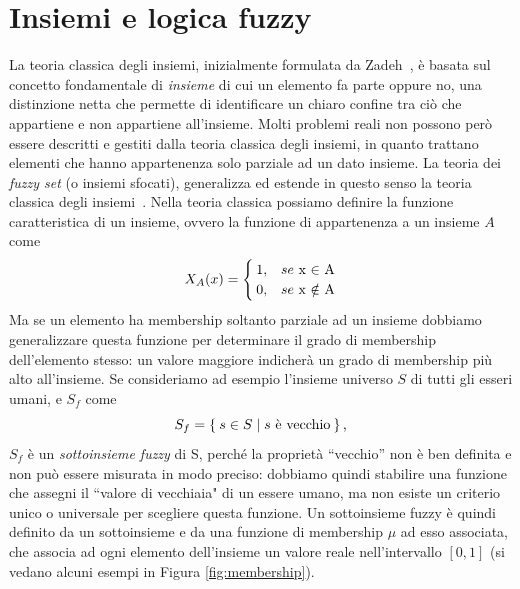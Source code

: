 \documentclass[oneside, openany]{book}
\begin{document}
		\section{Insiemi e logica fuzzy}
		La teoria classica degli insiemi, inizialmente formulata da Zadeh~\cite{bib:zadeh}, è basata sul concetto fondamentale di \textit{insieme} di cui un elemento fa parte oppure no, una distinzione netta che permette di identificare un chiaro confine tra ciò che appartiene e non appartiene all'insieme. Molti problemi reali non possono però essere descritti e gestiti dalla teoria classica degli insiemi, in quanto trattano elementi che hanno appartenenza solo parziale ad un dato insieme. La teoria dei \textit{fuzzy set} (o insiemi sfocati), generalizza ed estende in questo senso la teoria classica degli insiemi~\cite{bib:fuzzy, bib:fuzzy2}.\newline
		Nella teoria classica possiamo definire la funzione caratteristica di un insieme, ovvero la funzione di appartenenza a un insieme $A$ come
		\[
		X_A(x)=
		\begin{cases}
		1, & se $ x $ \in $ A$\\
		0, & se $ x $ \notin $ A$
		\end{cases}
		\]
		Ma se un elemento ha membership soltanto parziale ad un insieme dobbiamo generalizzare questa funzione per determinare il grado di membership dell'elemento stesso: un valore maggiore indicherà un grado di membership più alto all'insieme. Se consideriamo ad esempio l'insieme universo $S$ di tutti gli esseri umani, e $S_f$ come
		\[
		S_f=\Set{s \in S | s \text{ è vecchio}}\text{,}
		\]
		$S_f$ è un \textit{sottoinsieme fuzzy} di S, perché la proprietà ``vecchio'' non è ben definita e non può essere misurata in modo preciso: dobbiamo quindi stabilire una funzione che assegni il ``valore di vecchiaia" di un essere umano, ma non esiste un criterio unico o universale per scegliere questa funzione.\newline
		Un sottoinsieme fuzzy è quindi definito da un sottoinsieme e da una funzione di membership $\mu$ ad esso associata, che associa ad ogni elemento dell'insieme un valore reale nell'intervallo $[0,1]$ (si vedano alcuni esempi in Figura \ref{fig:membership}).\\
	
\end{document}
